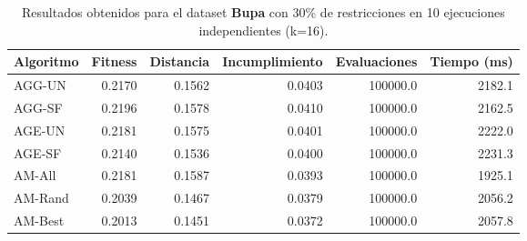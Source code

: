 \begin{table}[H]
    \centering
    \begin{tabular}{lrrrrr}
        \hline
        Algoritmo & Fitness & Distancia & Incumplimiento & Evaluaciones & Tiempo (ms)\\
        \hline
        AGG-UN & 0.2170 & 0.1562 & 0.0403 & 100000.0 & 2182.1 \\
        AGG-SF & 0.2196 & 0.1578 & 0.0410 & 100000.0 & 2162.5 \\
        AGE-UN & 0.2181 & 0.1575 & 0.0401 & 100000.0 & 2222.0 \\
        AGE-SF & 0.2140 & 0.1536 & 0.0400 & 100000.0 & 2231.3 \\
        AM-All & 0.2181 & 0.1587 & 0.0393 & 100000.0 & 1925.1 \\
        AM-Rand & 0.2039 & 0.1467 & 0.0379 & 100000.0 & 2056.2 \\
        AM-Best & 0.2013 & 0.1451 & 0.0372 & 100000.0 & 2057.8 \\
        \hline
    \end{tabular}
    \caption{Resultados obtenidos para el dataset \textbf{Bupa} con 30\% de restricciones en  10 ejecuciones independientes (k=16).}
    \label{tab:res_bupa_30}
\end{table}